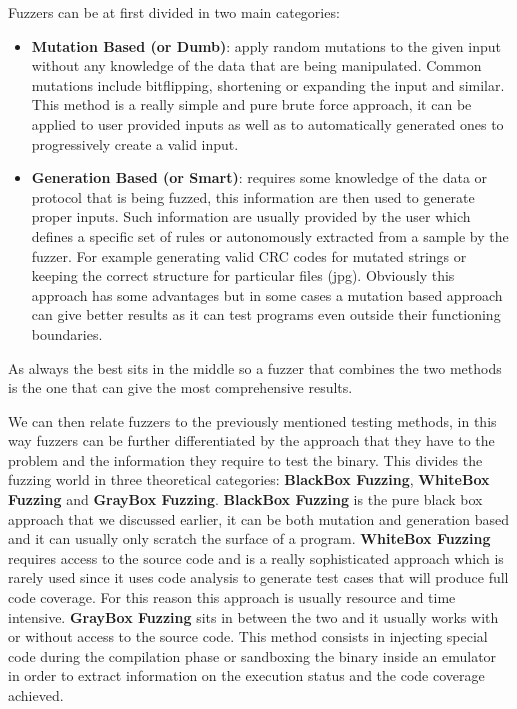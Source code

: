 \documentclass[../main.tex]{subfiles}
\begin{document}
Fuzzers can be at first divided in two main categories:

\begin{itemize}
  \item{\textbf{Mutation Based (or Dumb)}: apply random mutations to the given
  input without any knowledge of the data that are being manipulated. Common
  mutations include bitflipping, shortening or expanding the input and similar.
  This  method is a really simple and pure brute force approach, it can be
  applied  to user provided inputs as well as to automatically generated ones to
  progressively create a valid input.}

  \item{\textbf{Generation Based (or Smart)}: requires some knowledge of the
  data or protocol that is being fuzzed, this information are then used to
  generate proper inputs. Such information are usually provided by the user
  which defines a specific set of rules or autonomously extracted from a sample
  by the  fuzzer. For  example generating valid CRC codes for mutated  strings
  or  keeping the correct  structure for particular files (jpg). Obviously this
  approach has some  advantages but in some cases a mutation based approach can
  give better results  as it can test programs even outside their functioning
  boundaries.}

\end{itemize}

As always the best sits in the middle so a fuzzer that combines the two methods is the one that can give the most comprehensive results.

We can then relate fuzzers to the previously mentioned testing methods, in this way fuzzers can be further differentiated by the approach that they have to
the problem and the information they require to test the binary. This divides
the fuzzing world in three theoretical categories: \textbf{BlackBox Fuzzing}, \textbf{WhiteBox Fuzzing} and \textbf{GrayBox Fuzzing}. \textbf{BlackBox Fuzzing} is the pure black box approach that we discussed earlier, it can be both mutation and generation based and it can usually only scratch the surface of a program. \textbf{WhiteBox Fuzzing} requires access to the source code and is a really sophisticated approach which is rarely used since it uses code analysis to generate test cases that will produce full code coverage. For this reason this approach is usually resource and time intensive. \textbf{GrayBox Fuzzing} sits in between the two and it usually works with or without access to the source code. This method consists in injecting special code during the compilation phase or sandboxing the binary inside an emulator in order to extract information on the execution status and the code coverage achieved.
\end{document}
